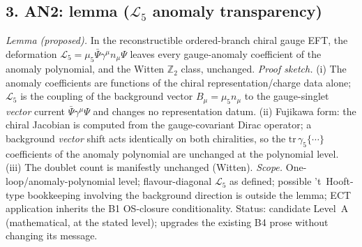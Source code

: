 \subsection*{3. AN2: lemma ($\mathcal L_5$ anomaly transparency)}
\emph{Lemma (proposed).}
In the reconstructible ordered-branch chiral gauge EFT, the
deformation $\mathcal L_5=\mu_5\bar\Psi\gamma^\mu n_\mu\Psi$ leaves
every gauge-anomaly coefficient of the anomaly polynomial, and the
Witten $\mathbb Z_2$ class, unchanged.
\emph{Proof sketch.}
(i) The anomaly coefficients are functions of the chiral
representation/charge data alone; $\mathcal L_5$ is the coupling of
the background vector $B_\mu=\mu_5 n_\mu$ to the gauge-singlet
\emph{vector} current $\bar\Psi\gamma^\mu\Psi$ and changes no
representation datum.
(ii) Fujikawa form: the chiral Jacobian is computed from the
gauge-covariant Dirac operator; a background \emph{vector} shift
acts identically on both chiralities, so the
$\mathrm{tr}\,\gamma_5\{\cdots\}$ coefficients of the anomaly
polynomial are unchanged at the polynomial level.
(iii) The doublet count is manifestly unchanged (Witten).
\emph{Scope.} One-loop/anomaly-polynomial level; flavour-diagonal
$\mathcal L_5$ as defined; possible 't~Hooft-type bookkeeping
involving the background direction is outside the lemma; ECT
application inherits the B1 OS-closure conditionality.
Status: candidate Level~A (mathematical, at the stated level);
upgrades the existing B4 prose without changing its message.

